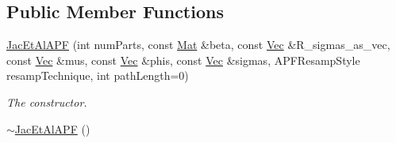 \subsection*{Public Member Functions}
\begin{DoxyCompactItemize}
\item 
\hyperlink{classJacEtAlAPF_ac410fda3eb39aea5703740ca75276938}{Jac\+Et\+Al\+A\+PF} (int num\+Parts, const \hyperlink{pmfs_8h_ae601f56a556993079f730483c574356f}{Mat} \&beta, const \hyperlink{pmfs_8h_a4c7df05c6f5e8a0d15ae14bcdbc07152}{Vec} \&R\+\_\+sigmas\+\_\+as\+\_\+vec, const \hyperlink{pmfs_8h_a4c7df05c6f5e8a0d15ae14bcdbc07152}{Vec} \&mus, const \hyperlink{pmfs_8h_a4c7df05c6f5e8a0d15ae14bcdbc07152}{Vec} \&phis, const \hyperlink{pmfs_8h_a4c7df05c6f5e8a0d15ae14bcdbc07152}{Vec} \&sigmas, A\+P\+F\+Resamp\+Style resamp\+Technique, int path\+Length=0)
\begin{DoxyCompactList}\small\item\em The constructor. \end{DoxyCompactList}\item 
\hyperlink{classJacEtAlAPF_ae601f6fd2c95012e54fabfc4072c91dd}{$\sim$\+Jac\+Et\+Al\+A\+PF} ()\hypertarget{classJacEtAlAPF_ae601f6fd2c95012e54fabfc4072c91dd}{}\label{classJacEtAlAPF_ae601f6fd2c95012e54fabfc4072c91dd}


\end{DoxyCompactItemize}
